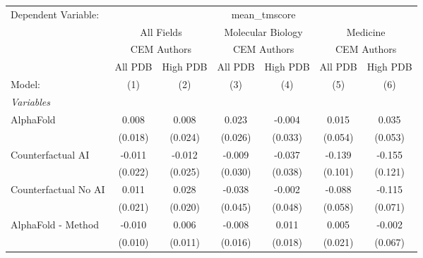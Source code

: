 \begingroup
\centering
\begin{tabular}{lcccccc}
   \tabularnewline \midrule \midrule
   Dependent Variable: & \multicolumn{6}{c}{mean\_tmscore}\\
 & \multicolumn{2}{c}{All Fields} & \multicolumn{2}{c}{Molecular Biology} & \multicolumn{2}{c}{Medicine} \\
\cmidrule(lr){2-3} \cmidrule(lr){4-5} \cmidrule(lr){6-7}
 & \multicolumn{2}{c}{CEM Authors} & \multicolumn{2}{c}{CEM Authors} & \multicolumn{2}{c}{CEM Authors} \\
\cmidrule(lr){2-3} \cmidrule(lr){4-5} \cmidrule(lr){6-7}
 & \multicolumn{1}{c}{All PDB} & \multicolumn{1}{c}{High PDB} & \multicolumn{1}{c}{All PDB} & \multicolumn{1}{c}{High PDB} & \multicolumn{1}{c}{All PDB} & \multicolumn{1}{c}{High PDB} \\
\cmidrule(lr){2-2} \cmidrule(lr){3-3} \cmidrule(lr){4-4} \cmidrule(lr){5-5} \cmidrule(lr){6-6} \cmidrule(lr){7-7}
   Model:                                                     & (1)         & (2)     & (3)     & (4)     & (5)         & (6)\\  
   \midrule
   \emph{Variables}\\
   AlphaFold                                                  & 0.008       & 0.008   & 0.023   & -0.004  & 0.015       & 0.035\\   
                                                              & (0.018)     & (0.024) & (0.026) & (0.033) & (0.054)     & (0.053)\\   
   Counterfactual AI                                          & -0.011      & -0.012  & -0.009  & -0.037  & -0.139      & -0.155\\   
                                                              & (0.022)     & (0.025) & (0.030) & (0.038) & (0.101)     & (0.121)\\   
   Counterfactual No AI                                       & 0.011       & 0.028   & -0.038  & -0.002  & -0.088      & -0.115\\   
                                                              & (0.021)     & (0.020) & (0.045) & (0.048) & (0.058)     & (0.071)\\   
   AlphaFold - Method                                         & -0.010      & 0.006   & -0.008  & 0.011   & 0.005       & -0.002\\   
                                                              & (0.010)     & (0.011) & (0.016) & (0.018) & (0.021)     & (0.067)\\   

\end{tabular}
